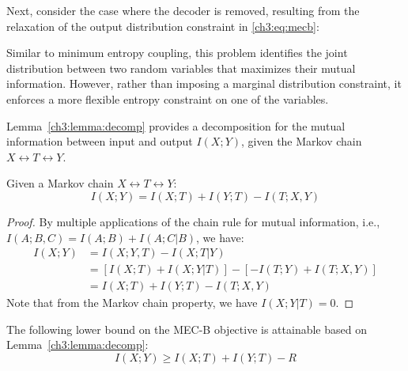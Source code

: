 Next, consider the case where the decoder is removed, resulting from the relaxation of the output distribution constraint in \eqref{ch3:eq:mecb}:


Similar to minimum entropy coupling, this problem identifies the joint distribution between two random variables that maximizes their mutual information. However, rather than imposing a marginal distribution constraint, it enforces a more flexible entropy constraint on one of the variables.


Lemma~\ref{ch3:lemma:decomp} provides a decomposition for the mutual information between input and output $I(X;Y)$, given the Markov chain $X \leftrightarrow T \leftrightarrow Y$.
 
\begin{lemma} \label{ch3:lemma:decomp}
    Given a Markov chain $X \leftrightarrow T \leftrightarrow Y$:
    \begin{equation}\label{ch3:eq:Idecomp}
        I(X;Y) = I(X;T) + I(Y;T) - I(T; X,Y)
    \end{equation}
\end{lemma}
\begin{proof}
By multiple applications of the chain rule for mutual information, i.e.,  $I(A;B,C)=I(A;B)+I(A;C|B)$, we have:
\begin{align}
    I(X;Y) &= I(X;Y,T) - I(X;T|Y) \\
    &= [I(X; T) + I(X; Y | T) ] - [ - I(T; Y) + I(T; X, Y) ] \\
    &= I(X;T) + I(Y;T) - I(T; X,Y)
\end{align}
Note that from the Markov chain property, we have $I(X; Y | T)=0$.
\end{proof}

The following lower bound on the MEC-B objective is attainable based on Lemma~\ref{ch3:lemma:decomp}:
\begin{equation}\label{ch3:eq:mecblb}
    I(X;Y) \geq I(X;T) + I(Y;T) - R
\end{equation}

